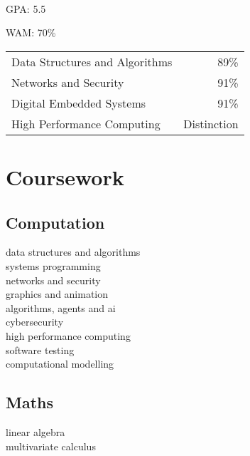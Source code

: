 \documentclass[a4paper]{style}
\begin{document}
\begin{minipage}[t]{0.45\textwidth}
\\
\begin{tightitemize}
    \item GPA\@: 5.5
    \item WAM\@: 70\%
\end{tightitemize}
\begin{tabular}{l|r}
    Data Structures and Algorithms & 89\% \\
    Networks and Security & 91\% \\
	Digital Embedded Systems & 91\% \\
    High Performance Computing & Distinction \\
\end{tabular}


\sectionspace{} %

\section{Coursework}
\subsection{Computation}
data structures and algorithms \\
systems programming \\
networks and security \\
graphics and animation \\
algorithms, agents and ai \\
cybersecurity \\
high performance computing \\
software testing \\
computational modelling
\sectionspace{}

\subsection{Maths}
linear algebra \\
multivariate calculus

\sectionspace{} %


\end{minipage}
\end{document}
